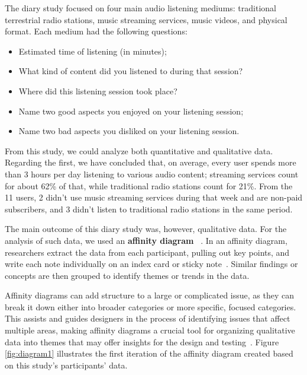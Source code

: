 The diary study focused on four main audio listening mediums: traditional terrestrial radio stations, music streaming services, music videos, and physical format. Each medium had the following questions:

\begin{itemize}
  \item Estimated time of listening (in minutes);
  \item What kind of content did you listened to during that session?
  \item Where did this listening session took place?
  \item Name two good aspects you enjoyed on your listening session;
  \item Name two bad aspects you disliked on your listening session.
\end{itemize}

From this study, we could analyze both quantitative and qualitative data. Regarding the first, we have concluded that, on average, every user spends more than 3 hours per day listening to various audio content; streaming services count for about 62\% of that, while traditional radio stations count for 21\%. From the 11 users, 2 didn't use music streaming services during that week and are non-paid subscribers, and 3 didn't listen to traditional radio stations in the same period. 

The main outcome of this diary study was, however, qualitative data. For the analysis of such data, we used an \textbf{affinity diagram} ~\cite{Wilson2012}. In an affinity diagram, researchers extract the data from each participant, pulling out key points, and write each note individually on an index card or sticky note~\cite{Courage2005}. Similar findings or concepts are then grouped to identify themes or trends in the data. 

Affinity diagrams can add structure to a large or complicated issue, as they can break it down either into broader categories or more specific, focused categories. This assists and guides designers in the process of identifying issues that affect multiple areas, making affinity diagrams a crucial tool for organizing qualitative data into themes that may offer insights for the design and testing~\cite{Holtzblatt1988}. Figure \ref{fig:diagram1} illustrates the first iteration of the affinity diagram created based on this study's participants' data.

